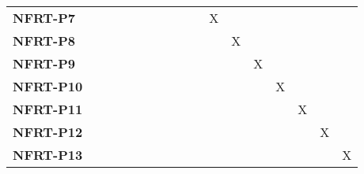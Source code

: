 \documentclass[12pt, titlepage]{article}
\begin{document}
\begin{landscape}
\begin{longtable}{|l|ccccccccccccc|}
		\textbf{NFRT-P7} & ~                                                         & ~             & ~             & ~             & ~             & ~             & X             & ~             & ~             & ~             & ~ & ~ & ~ \\
		\textbf{NFRT-P8} & ~                                                         & ~             & ~             & ~             & ~             & ~             & ~             & X             & ~             & ~             & ~ & ~ & ~ \\
		\textbf{NFRT-P9} & ~                                                         & ~             & ~             & ~             & ~             & ~             & ~             & ~             & X             & ~             & ~ & ~ & ~ \\
		\textbf{NFRT-P10} & ~                                                         & ~             & ~             & ~             & ~             & ~             & ~             & ~             & ~             & X             & ~ & ~ & ~ \\
		\textbf{NFRT-P11} & ~                                                         & ~             & ~             & ~             & ~             & ~             & ~             & ~             & ~             & ~             & X & ~ & ~ \\
		\textbf{NFRT-P12} & ~                                                         & ~             & ~             & ~             & ~             & ~             & ~             & ~             & ~             & ~             & ~ & X & ~ \\
		\textbf{NFRT-P13} & ~                                                         & ~             & ~             & ~             & ~             & ~             & ~             & ~             & ~             & ~             & ~ & ~ & X \\
		\hline
	\end{longtable}

	\newpage
	

\end{landscape}
\end{document}
